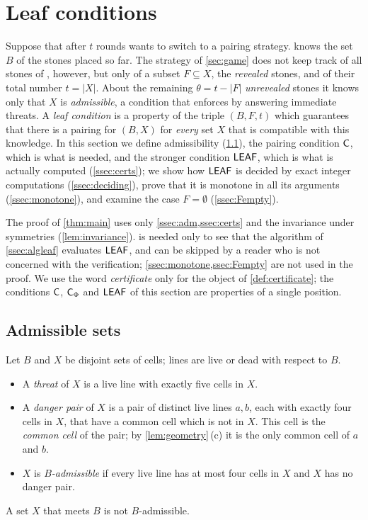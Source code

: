 \section{Leaf conditions}\label{sec:leaf}

Suppose that after $t$ rounds \Breaker{} wants to switch to a pairing strategy. \Breaker{} knows the set
$B$ of the stones placed so far. The strategy of \cref{sec:game} does not keep track of all stones of
\Maker, however, but
only of a subset $F\subseteq X$, the \emph{revealed} stones, and of their total number $t=|X|$. About the
remaining $\theta=t-|F|$ \emph{unrevealed} stones it knows only that $X$ is \emph{admissible}, a condition
that \Breaker{} enforces by answering immediate threats. A \emph{leaf condition} is a property of the
triple $(B,F,t)$ which guarantees that there is a pairing for $(B,X)$ for \emph{every} set $X$ that is
compatible with this knowledge. In this section we define admissibility (\cref{ssec:adm}), the pairing
condition $\mathsf{C}$, which is what is needed, and the stronger condition $\mathsf{LEAF}$, which is what is actually
computed (\cref{ssec:certs}); we
show how $\mathsf{LEAF}$ is decided by exact integer computations (\cref{ssec:deciding}), prove that it is monotone
in all its arguments (\cref{ssec:monotone}), and examine the case $F=\emptyset$ (\cref{ssec:Fempty}).

The proof of \cref{thm:main} uses only \cref{ssec:adm,ssec:certs} and the invariance under symmetries
(\cref{lem:invariance}).  is needed only to see that the algorithm of
\cref{ssec:algleaf} evaluates $\mathsf{LEAF}$, and can be skipped by a reader who is not concerned with the
verification; \cref{ssec:monotone,ssec:Fempty} are not used in the proof. We use the word
\emph{certificate} only for the object of \cref{def:certificate}; the conditions $\mathsf{C}$, $\mathsf{C}_\Phi$ and $\mathsf{LEAF}$
of this section are properties of a single position.

\subsection{Admissible sets}\label{ssec:adm}

\begin{definition}\label{def:admissible}
Let $B$ and $X$ be disjoint sets of cells; lines are live or dead with respect to $B$.
\begin{itemize}
\item A \emph{threat} of $X$ is a live line with exactly five cells in $X$.
\item A \emph{danger pair} of $X$ is a pair of distinct live lines $a,b$, each with exactly four cells in
      $X$, that have a common cell which is not in $X$. This cell is the \emph{common cell} of the pair; by
      \cref{lem:geometry}\,\textup{(c)} it is the only common cell of $a$ and $b$.
\item $X$ is \emph{$B$-admissible} if every live line has at most four cells in $X$ and $X$ has no danger
      pair.
\end{itemize}
A set $X$ that meets $B$ is not $B$-admissible.
\end{definition}

